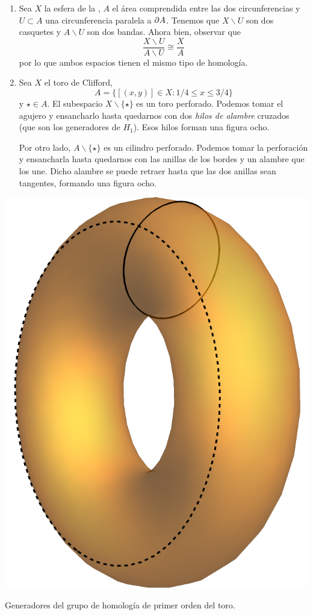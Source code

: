 \begin{example}
\begin{enumerate}
\item Sea $X$ la esfera de la , $A$ el área
comprendida entre las dos circunferencias y $U\subset A$ una circunferencia
paralela a $\partial A$. Tenemos que $X\backslash U$ son dos casquetes y
$A\backslash U$ son dos bandas. Ahora bien, observar que
\[\frac{X\backslash U}{A\backslash U} \cong \frac{X}{A}\]
por lo que ambos espacios tienen el mismo tipo de homología.
\item Sea $X$ el toro de Clifford,
\[A=\{[(x,y)] \in X\colon 1/4 \leq x \leq 3/4\}\]
y $\star \in A$. El subespacio $X\backslash\{\star\}$ es un toro
perforado. Podemos tomar el agujero y ensancharlo hasta quedarnos con dos
\emph{hilos de alambre} cruzados (que son los generadores de $H_1$). Esos
hilos forman una figura ocho.

Por otro lado, $A\backslash\{\star\}$ es un cilindro perforado. Podemos tomar
la perforación y ensancharla hasta quedarnos con las anillas de los bordes y
un alambre que los une. Dicho alambre se puede retraer hasta que las dos
anillas sean tangentes, formando una figura ocho.
\end{enumerate}
\end{example}

\begin{marginfigure}
\includegraphics{Figures/ToroGeneradoresOrden1.pdf}
\caption{Generadores del grupo de homología de primer orden del toro.}
\end{marginfigure}

